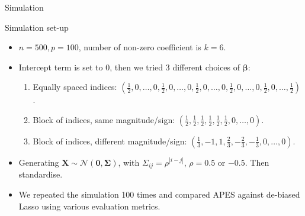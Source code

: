\documentclass[12pt,aspectratio=169]{beamer}
\newcommand{\bX}{\boldsymbol{X}}
\newcommand{\bbeta}{\boldsymbol{\beta}}
\begin{document}
\begin{frame}
\Huge{\color{themeBlue} Simulation}
\end{frame}


\begin{frame}{Simulation set-up}
	\begin{itemize}
		\item $ n  = 500,  p = 100$, number of non-zero coefficient is $ k = 6 $.
		
		\item Intercept term is set to 0, then we tried 3 different choices of $ \bbeta $: 
		\begin{enumerate}
			\item Equally spaced indices: $ (\frac{1}{2}, 0, \dots, 0,\frac{1}{2}, 0, \dots,0,\frac{1}{2}, 0, \dots, 0,\frac{1}{2}, 0, \dots, 0,\frac{1}{2}, 0, \dots, \frac{1}{2}) $.
			\item Block of indices, same magnitude/sign: $ (\frac{1}{2}, \frac{1}{2}, \frac{1}{2}, \frac{1}{2}, \frac{1}{2}, \frac{1}{2}, 0, \dots, 0) $.
			\item Block of indices, different magnitude/sign: $ (\frac{1}{3}, -1, 1, \frac{2}{3}, -\frac{2}{3}, -\frac{1}{3}, 0, \dots, 0) $.
		\end{enumerate}
		
		\item Generating $ \bX \sim \mathcal{N}(\boldsymbol{0}, \boldsymbol{\Sigma})$, with $ \Sigma_{ij} = \rho^{|i-j|} $, $ \rho = 0.5 $ or $ -0.5 $. Then standardise. 
		
		
		
		
		\item We repeated the simulation 100 times and compared APES against de-biased Lasso using various evaluation metrics.
	\end{itemize}
\end{frame}

%	
%	
%	
\end{document}
